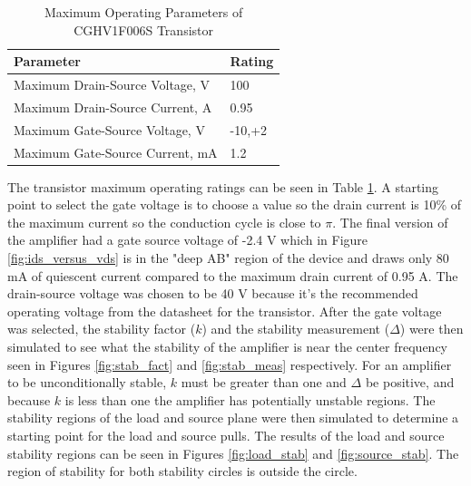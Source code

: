 \begin{table}
    \centering
    \caption{Maximum Operating Parameters of CGHV1F006S Transistor}
    \label{table:trans_param}
    \begin{tabular}{|l|l|}
      \hline
      {Parameter} & {Rating}\\ \hline
      {Maximum Drain-Source Voltage, V} & 100 \\ \hline
      {Maximum Drain-Source Current, A} & 0.95\\ \hline
      {Maximum Gate-Source Voltage, V}  & -10,+2 \\ \hline
      {Maximum Gate-Source Current, mA} & 1.2 \\ \hline
    \end{tabular}
\end{table}


The transistor maximum operating ratings can be seen in Table \ref{table:trans_param}. A starting point to select the gate voltage is to choose a value so the drain current is 10\% of the maximum current so the conduction cycle is close to $\pi$. The final version of the amplifier had a gate source voltage of -2.4 V which in Figure \ref{fig:ids_versus_vds} is in the "deep AB" region of the device and draws only 80 mA of quiescent current compared to the maximum drain current of 0.95 A. The drain-source voltage was chosen to be 40 V because it's the recommended operating voltage from the datasheet for the transistor. After the gate voltage was selected, the stability factor ($k$) and the stability measurement ($\Delta$) were then simulated to see what the stability of the amplifier is near the center frequency seen in Figures \ref{fig:stab_fact} and \ref{fig:stab_meas} respectively. For an amplifier to be unconditionally stable, $k$ must be greater than one and $\Delta$ be positive, and because $k$ is less than one the amplifier has potentially unstable regions. The stability regions of the load and source plane were then simulated to determine a starting point for the load and source pulls. The results of the load and source stability regions can be seen in Figures \ref{fig:load_stab} and \ref{fig:source_stab}. The region of stability for both stability circles is outside the circle.


